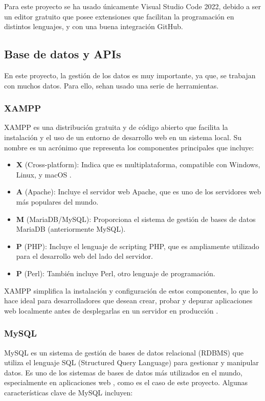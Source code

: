 Para este proyecto se ha usado únicamente Visual Studio Code 2022, debido a ser un editor gratuito que posee extensiones que facilitan la programación en distintos lenguajes, y con una buena integración GitHub.

\subsection{Base de datos y APIs}

En este proyecto, la gestión de los datos es muy importante, ya que, se trabajan con muchos datos. Para ello, sehan usado una serie de herramientas.

\subsubsection{XAMPP}
XAMPP es una distribución gratuita y de código abierto que facilita la instalación y el uso de un entorno de desarrollo web en un sistema local. Su nombre es un acrónimo que representa los componentes principales que incluye: 

\begin{itemize}
    \item \textbf{X} (Cross-platform): Indica que es multiplataforma, compatible con Windows, Linux, y macOS \cite{xampp}.
    \item \textbf{A} (Apache): Incluye el servidor web Apache, que es uno de los servidores web más populares del mundo.
    \item \textbf{M} (MariaDB/MySQL): Proporciona el sistema de gestión de bases de datos MariaDB (anteriormente MySQL).
    \item \textbf{P} (PHP): Incluye el lenguaje de scripting PHP, que es ampliamente utilizado para el desarrollo web del lado del servidor.
    \item \textbf{P} (Perl): También incluye Perl, otro lenguaje de programación.
\end{itemize}

XAMPP simplifica la instalación y configuración de estos componentes, lo que lo hace ideal para desarrolladores que desean crear, probar y depurar aplicaciones web localmente antes de desplegarlas en un servidor en producción \cite{xamppdocs}.

\subsubsection{MySQL}

MySQL es un sistema de gestión de bases de datos relacional (RDBMS) que utiliza el lenguaje SQL (Structured Query Language) para gestionar y manipular datos. Es uno de los sistemas de bases de datos más utilizados en el mundo, especialmente en aplicaciones web \cite{mysql}, como es el caso de este proyecto. Algunas características clave de MySQL incluyen:

